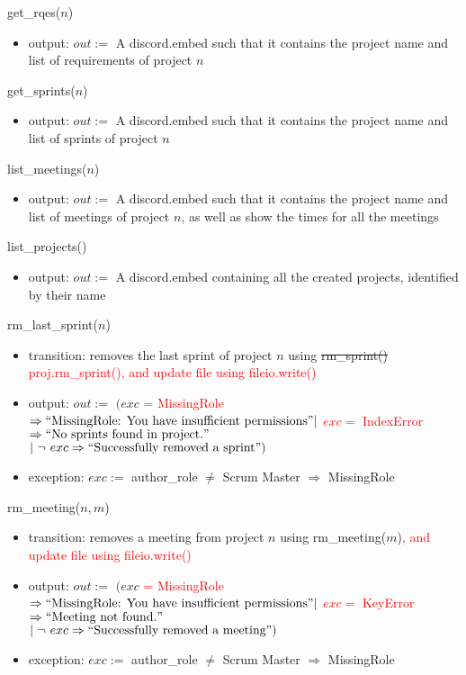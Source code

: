 \documentclass[12pt, titlepage]{article}
\begin{document}
\noindent get\_rqes($n$)
\begin{itemize}
    \item output: $out :=$ A discord.embed such that it contains the project name and list of requirements of project $n$
\end{itemize}

\noindent get\_sprints($n$)
\begin{itemize}
    \item output: $out :=$ A discord.embed such that it contains the project name and list of sprints of project $n$
\end{itemize}

\noindent list\_meetings($n$)
\begin{itemize}
    \item output: $out :=$ A discord.embed such that it contains the project name and list of meetings of project $n$, as well as show the times for all the meetings
\end{itemize}

\noindent list\_projects()
\begin{itemize}
    \item output: $out :=$ A discord.embed containing all the created projects, identified by their name
\end{itemize}

\noindent rm\_last\_sprint($n$)
\begin{itemize}
    \item transition: removes the last sprint of project $n$ using \sout{rm\_sprint()} \textcolor{red}{proj.rm\_sprint(), and update file using fileio.write()}
    
    \item output: $out :=$ $(exc$ \textcolor{red}{= MissingRole} $\Rightarrow ``\text{MissingRole: You have insufficient permissions}"\\ |\ $\textcolor{red}{$exc =$ IndexError $\Rightarrow ``\text{No sprints found in project.}"$}\\ $|\ \lnot\ exc \Rightarrow ``\text{Successfully removed a sprint}")$
    
    \item exception: $exc :=$ author\_role $\neq$ Scrum Master $\Rightarrow$ MissingRole
\end{itemize}

\noindent rm\_meeting($n, m$)
\begin{itemize}
    \item transition: removes a meeting from project $n$ using rm\_meeting($m$)\textcolor{red}{, and update file using fileio.write()}
    \item output: $out :=$ $(exc$ \textcolor{red}{= MissingRole} $\Rightarrow ``\text{MissingRole: You have insufficient permissions}"\\ |\ $\textcolor{red}{$exc =$ KeyError $\Rightarrow ``\text{Meeting not found.}"$}\\ $|\ \lnot\ exc \Rightarrow ``\text{Successfully removed a meeting}")$
    \item exception: $exc :=$ author\_role $\neq$ Scrum Master $\Rightarrow$ MissingRole
\end{itemize}
\end{document}
